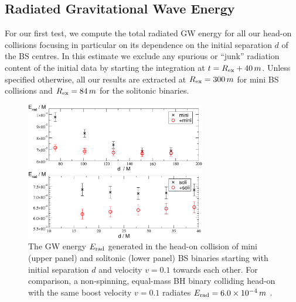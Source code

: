 \subsection{Radiated Gravitational Wave Energy}
%
For our first test, we compute the total radiated
GW energy for all our head-on collisions focusing
in particular on its dependence on the initial separation
$d$ of the BS centres. In this estimate we exclude
any spurious or ``junk'' radiation content
of the initial data by starting the integration
at $t=R_{\rm ex}+40\,m$. Unless specified otherwise,
all our results are extracted at $R_{\rm ex}=300\,m$ for
mini BS collisions and $R_{\rm ex}=84\,m$ for the
solitonic binaries.
%
\begin{figure}
    \centering
    \includegraphics[width=0.7\textwidth]{malaise_source/erad.pdf}
    \caption{The GW energy $E_{\rm rad}$ generated in
    the head-on collision of mini (upper panel) and solitonic (lower panel) BS binaries starting
    with initial separation $d$ and velocity $v=0.1$ towards
    each other.
    For comparison, a non-spinning, equal-mass BH binary
    colliding head-on with the same boost velocity $v=0.1$ radiates $E_{\rm rad}=6.0\times 10^{-4}\,m$
    \cite{Sperhake:2019oaw}.
    }
    \label{mal:fig:erad}
\end{figure}
%

